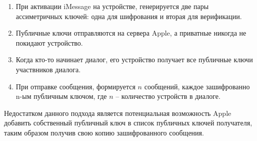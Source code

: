 \begin{enumerate}
	\item При активации iMessage на устройстве, генерируется две пары ассиметричных ключей: одна для шифрования и вторая для верификации.
	\item Публичные ключи отправляются на сервера Apple, а приватные никогда не покидают устройство.
	\item Когда кто-то начинает диалог, его устройство получает все публичные ключи участвников диалога.
	\item При отправке сообщения, формируется \(n\) сообщений, каждое зашифрованно n-ым публичным ключом, где \(n\) -- количество устройств в диалоге.
\end{enumerate}

Недостатком данного подхода является потенциальная возможность Apple добавить собственный публичный ключ в список публичных ключей получателя, таким образом получив свою копию зашифрованного сообщения.